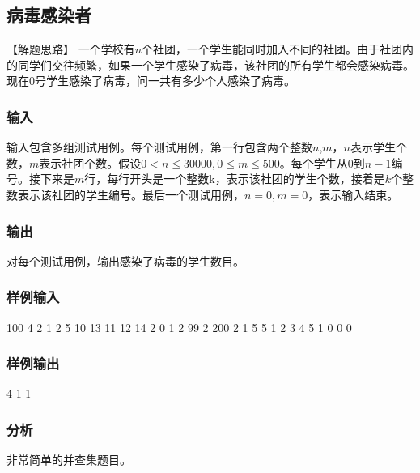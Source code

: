 \subsection{病毒感染者} %
【解题思路】
一个学校有$n$个社团，一个学生能同时加入不同的社团。由于社团内的同学们交往频繁，如果一个学生感染了病毒，该社团的所有学生都会感染病毒。现在0号学生感染了病毒，问一共有多少个人感染了病毒。

\subsubsection{输入}
输入包含多组测试用例。每个测试用例，第一行包含两个整数$n$,$m$，$n$表示学生个数，$m$表示社团个数。假设$0 < n \leq 30000, 0 \leq m \leq 500$。每个学生从0到$n-1$编号。接下来是$m$行，每行开头是一个整数k，表示该社团的学生个数，接着是$k$个整数表示该社团的学生编号。最后一个测试用例，$n=0,m=0$，表示输入结束。

\subsubsection{输出}
对每个测试用例，输出感染了病毒的学生数目。

\subsubsection{样例输入}
\begin{Code}
100 4
2 1 2
5 10 13 11 12 14
2 0 1
2 99 2
200 2
1 5
5 1 2 3 4 5
1 0
0 0
\end{Code}

\subsubsection{样例输出}
\begin{Code}
4
1
1
\end{Code}

\subsubsection{分析}
非常简单的并查集题目。

